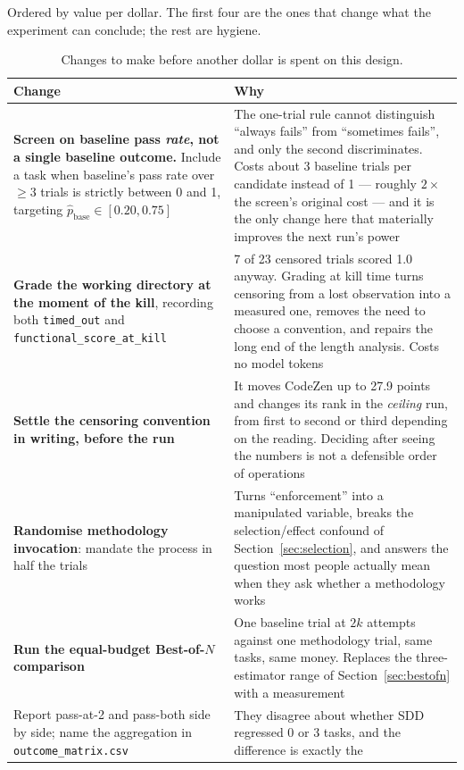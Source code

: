 \documentclass[11pt,a4paper]{article}
\newcommand{\code}[1]{\texttt{\small #1}}
\begin{document}
Ordered by value per dollar. The first four are the ones that change what the experiment can
conclude; the rest are hygiene.

\begin{table}[htbp]
\centering
\caption{Changes to make before another dollar is spent on this design.}
\label{tab:recommendations}
\small
\begin{tabular}{@{}p{6.6cm}p{9.2cm}@{}}
\toprule
Change & Why \\
\midrule
\textbf{Screen on baseline pass \emph{rate}, not a single baseline outcome.} Include a task
when baseline's pass rate over $\ge 3$ trials is strictly between 0 and 1, targeting
$\hat p_{\text{base}} \in [0.20, 0.75]$ &
The one-trial rule cannot distinguish ``always fails'' from ``sometimes fails'', and only the
second discriminates. Costs about 3 baseline trials per candidate instead of 1 --- roughly
$2\times$ the screen's original cost --- and it is the only change here that materially
improves the next run's power \\
\addlinespace
\textbf{Grade the working directory at the moment of the kill}, recording both
\code{timed\_out} and \code{functional\_score\_at\_kill} &
7 of 23 censored trials scored 1.0 anyway. Grading at kill time turns censoring from a lost
observation into a measured one, removes the need to choose a convention, and repairs the
long end of the length analysis. Costs no model tokens \\
\addlinespace
\textbf{Settle the censoring convention in writing, before the run} &
It moves CodeZen up to 27.9 points and changes its rank in the \emph{ceiling} run, from
first to second or third depending on the reading. Deciding after seeing the numbers is not a
defensible order of operations \\
\addlinespace
\textbf{Randomise methodology invocation}: mandate the process in half the trials &
Turns ``enforcement'' into a manipulated variable, breaks the selection/effect confound of
Section~\ref{sec:selection}, and answers the question most people actually mean when they ask
whether a methodology works \\
\addlinespace
\textbf{Run the equal-budget Best-of-$N$ comparison} &
One baseline trial at $2k$ attempts against one methodology trial, same tasks, same money.
Replaces the three-estimator range of Section~\ref{sec:bestofn} with a measurement \\
\addlinespace
Report pass-at-2 and pass-both side by side; name the aggregation in
\code{outcome\_matrix.csv} &
They disagree about whether SDD regressed 0 or 3 tasks, and the difference is exactly the

\end{tabular}
\end{table}
\end{document}
